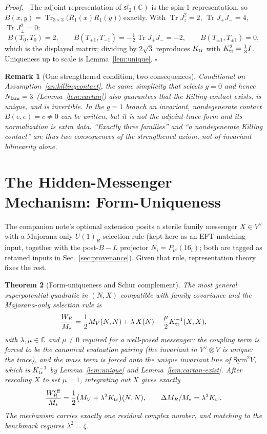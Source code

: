 \documentclass[
  aps,
  prd,
  preprint,
  nofootinbib,
  superscriptaddress,
  longbibliography
]{revtex4-2}
\newcommand{\sltwo}{\mathfrak{sl}_2(\mathbb C)}
\DeclareMathOperator{\Tr}{Tr}
\newtheorem{theorem}{Theorem}[section]
\newtheorem{remark}[theorem]{Remark}
\newenvironment{proof}{\par\noindent\textit{Proof.}\ }{\hfill\(\square\)\par}
\begin{document}
\begin{proof}
The adjoint representation of \(\sltwo\) is the spin-1 representation, so
\(B(x,y)=\Tr_{3\times3}\big(R_1(x)R_1(y)\big)\) exactly.  With
\(\Tr J_z^2=2\), \(\Tr J_+J_-=4\), \(\Tr J_\pm^2=0\):
\[
  B(T_0,T_0)=2,\qquad
  B(T_{+1},T_{-1})=-\tfrac12\Tr J_+J_-=-2,\qquad
  B(T_{\pm1},T_{\pm1})=0 ,
\]
which is the displayed matrix; dividing by \(2\sqrt3\) reproduces
\(K_{\rm tr}\) with \(K_{\rm tr}^2=\tfrac13 I\).  Uniqueness up to scale is
Lemma~\ref{lem:unique}.
\end{proof}

\begin{remark}[One strengthened condition, two consequences]
\label{rem:weld}
Conditional on Assumption~\ref{an:killingcontact}, the same simplicity that
selects \(g=0\) and hence \(N_{\rm fam}=3\)
(Lemma~\ref{lem:cartan}) also guarantees that the Killing contact exists,
is unique, and is invertible.  In the \(g=1\) branch an invariant,
nondegenerate contact \(B(e,e)=c\ne0\) can be written, but it is not the
adjoint-trace form and its normalization is extra data.  ``Exactly three
families'' and ``a nondegenerate Killing contact'' are thus two consequences
of the strengthened axiom, not of invariant bilinearity alone.
\end{remark}

\section{The Hidden-Messenger Mechanism: Form-Uniqueness}
\label{sec:messenger}

The companion note's optional extension posits a sterile family messenger
\(X\in V^\vee\) with a Majorana-only \(U(1)_R\) selection rule (kept here
as an EFT matching input, together with the post-\(B\!-\!L\) projector
\(N_i=P_{\nu^c}(16_i)\); both are tagged as retained inputs in
Sec.~\ref{sec:provenance}).  Given that rule, representation theory fixes
the rest.

\begin{theorem}[Form-uniqueness and Schur complement]
\label{thm:messenger}
The most general superpotential quadratic in \((N,X)\) compatible with
family covariance and the Majorana-only selection rule is
\[
  \frac{W_R}{M_*}
  =\frac12 M_V(N,N)+\lambda\,X(N)-\frac{\mu}2 K_{\rm tr}^{-1}(X,X),
\]
with \(\lambda,\mu\in\mathbb C\) and \(\mu\ne0\) required for a well-posed
messenger: the coupling term is forced to be the canonical evaluation
pairing (the invariant in \(V^\vee\otimes V\) is unique: the trace), and
the mass term is forced onto the unique invariant line of
\(\mathrm{Sym}^2V\), which is \(K_{\rm tr}^{-1}\) by
Lemma~\ref{lem:unique} and Lemma~\ref{lem:cartan-exist}.  After rescaling
\(X\) to set \(\mu=1\), integrating out \(X\) gives exactly
\[
  \frac{W_R^{\rm eff}}{M_*}
  =\frac12\big(M_V+\lambda^2K_{\rm tr}\big)(N,N),
  \qquad
  \Delta M_R/M_*=\lambda^2K_{\rm tr}.
\]
The mechanism carries exactly one residual complex number, and matching to
the benchmark requires \(\lambda^2=\zeta\).
\end{theorem}
\end{document}
